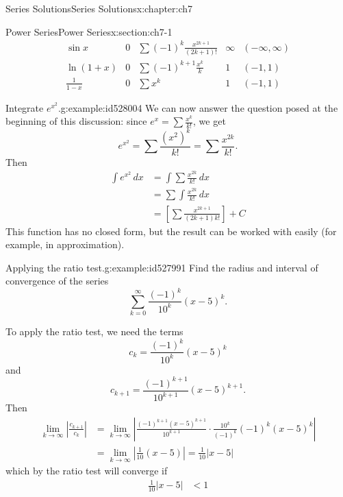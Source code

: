 \documentclass[oneside,10pt,]{book}
\numberwithin{equation}{section}
\newcommand{\abs}[1]{\left\vert#1\right\vert}
\numberwithin{equation}{section}
\newcommand{\lt}{<}
\newcommand{\amp}{&}
\begin{document}
\begin{chapterptx}{Series Solutions}{}{Series Solutions}{}{}{x:chapter:ch7}
\begin{sectionptx}{Power Series}{}{Power Series}{}{}{x:section:ch7-1}
\begin{equation*}
\begin{array}{c|c|c|c|c}
\sin x \amp 0 \amp \sum (-1)^k \frac{x^{2k+1}}{(2k+1)!} \amp \infty \amp (-\infty, \infty) \\
\ln (1+x) \amp 0 \amp \sum (-1)^{k+1} \frac{x^k}{k} \amp 1 \amp (-1, 1) \\
\frac{1}{1-x} \amp 0 \amp \sum x^k \amp 1 \amp (-1,1)
\end{array}
\end{equation*}
%
\begin{example}{Integrate \(e^{x^2}\).}{g:example:id528004}%
We can now answer the question posed at the beginning of this discussion: since \(e^x = \sum \frac{x^k}{k!}\), we get%
\begin{equation*}
e^{x^2} = \sum \frac{(x^2)^k}{k!} = \sum \frac{x^{2k}}{k!}.
\end{equation*}
Then%
\begin{align*}
\int e^{x^2} \, dx \amp = \int \sum \frac{x^{2k}}{k!}\,dx \\
\amp = \sum \int \frac{x^{2k}}{k!} \, dx \\
\amp = \left[\sum \frac{x^{2k+1}}{(2k+1) k!}\right] + C
\end{align*}
This function has no closed form, but the result can be worked with easily (for example, in approximation).%
\end{example}
\begin{example}{Applying the ratio test.}{g:example:id527991}%
Find the radius and interval of convergence of the series%
\begin{equation*}
\sum_{k=0}^\infty \frac{(-1)^k}{10^k} (x-5)^k.
\end{equation*}
%
\par
To apply the ratio test, we need the terms%
\begin{equation*}
c_k = \frac{(-1)^k}{10^k}(x-5)^k
\end{equation*}
and%
\begin{equation*}
c_{k+1} = \frac{(-1)^{k+1}}{10^{k+1}}(x-5)^{k+1}.
\end{equation*}
Then%
\begin{align*}
\lim_{k\to \infty} \abs{\frac{c_{k+1}}{c_k}} \amp = \lim_{k\to\infty} \abs{\frac{(-1)^{k+1}(x-5)^{k+1}}{10^{k+1}}\cdot\frac{10^k}{(-1)^k}{(-1)^k(x-5)^k}}\\
\amp = \lim_{k\to\infty} \abs{\frac{1}{10}(x-5)} = \frac{1}{10}\abs{x-5}
\end{align*}
which by the ratio test will converge if%
\begin{align*}
\frac{1}{10}\abs{x-5} \amp \lt 1\\

\end{align*}
\end{example}
\end{sectionptx}
\end{chapterptx}
\end{document}
